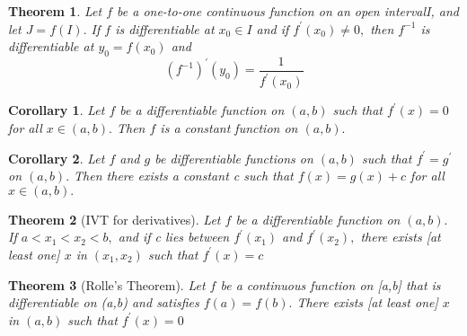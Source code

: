 \documentclass[12pt]{article}
\newtheorem{theorem}{Theorem}[section]
\newtheorem{corollary}{Corollary}[theorem]
\begin{document}
\begin{theorem}
	Let $f$ be a one-to-one continuous function on an open intervalI, and
	let $J = f ( I ) .$ If $f$ is differentiable at $x _ { 0 } \in I$ and if $f ^ { \prime } \left( x _ { 0 } \right) \neq 0 ,$ then
	$f ^ { - 1 }$ is differentiable at $y _ { 0 } = f \left( x _ { 0 } \right)$ and 
	$$
	\left( f ^ { - 1 } \right) ^ { \prime } \left( y _ { 0 } \right) = \frac { 1 } { f ^ { \prime } \left( x _ { 0 } \right) }
	$$
\end{theorem}

\begin{corollary}
	Let $f$ be a differentiable function on $( a , b )$ such that $f ^ { \prime } ( x ) = 0$ for all
	$x \in ( a , b ) .$ Then $f$ is a constant function on $( a , b ) .$
\end{corollary}

\begin{corollary}
	Let $f$ and $g$ be differentiable functions on $( a , b )$ such that $f ^ { \prime } = g ^ { \prime }$ on
	$( a , b ) .$ Then there exists a constant c such that $f ( x ) = g ( x ) + c$ for
	all $x \in ( a , b ) .$
\end{corollary}

\begin{theorem}[IVT for derivatives]
	Let $f$ be a differentiable function on $( a , b ) .$ If $a < x _ { 1 } < x _ { 2 } < b ,$ and
	if c lies between $f ^ { \prime } \left( x _ { 1 } \right)$ and $f ^ { \prime } \left( x _ { 2 } \right) ,$ there exists [at least one] $x$ in
	$\left( x _ { 1 } , x _ { 2 } \right)$ such that $f ^ { \prime } ( x ) = c$
\end{theorem}

\begin{theorem}[Rolle’s Theorem]
	Let $f$ be a continuous function on [a,b] that is differentiable on (a,b)
	and satisfies $f ( a ) = f ( b ) .$ There exists [at least one] $x$ in $( a , b )$ such
	that $f ^ { \prime } ( x ) = 0$
\end{theorem}
\end{document}
